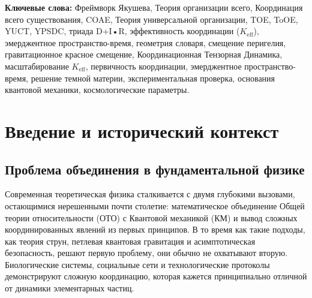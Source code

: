 \documentclass[11pt,a4paper]{article}
\begin{document}
\begin{abstract}
		Фреймворк является микропричинным ($v \leq c$ всегда), воспроизводит Общую теорию относительности и Квантовую механику в проверенных пределах, когда эффективность координации $K_{\mathrm{eff}} \to 1$, и дает проверяемые предсказания для прецизионных измерений в астрофизике, физике частиц и квантовой информации.
		
		\vspace{0.5em}
		\noindent \textbf{Ключевое открытие:} 
		Мы идентифицируем аксиоматический каркас теории как замкнутую \textbf{Алгебраическую петлю} фундаментальных констант ($S_{\mathrm{odd}} = 6/5$, $S_{\mathrm{even}} = 4/5$), которая строго определяет универсальный показатель масштабирования $\beta = 2/3$. Мы демонстрируем, что эта петля образует самосогласованную, безпараметрическую логическую систему. Внутренняя согласованность этой структуры мощно подтверждается возникающим геометрическим совпадением высокой точности: $S_{\mathrm{odd}}\varphi^2 \approx \pi$ (ошибка $10^{-5}$), связывающим дискретный спектр масс фермионов непосредственно с непрерывной геометрией пространства-времени. Это устанавливает YUCT не как феноменологическую подгонку, а как единую, фальсифицируемую аксиоматическую основу для координационной динамики реальности.
		
	\end{abstract}
	
	\noindent\textbf{Ключевые слова:} Фреймворк Якушева, Теория организации всего, Координация всего существования, COAE, Теория универсальной организации, TOE, ToOE, YUCT, YPSDC, триада D+I•R, эффективность координации ($K_{\mathrm{eff}}$), эмерджентное пространство-время, геометрия словаря, смещение перигелия, гравитационное красное смещение, Координационная Тензорная Динамика, масштабирование $K_{\mathrm{eff}}$, первичность координации, эмерджентное пространство-время, решение темной материи, экспериментальная проверка, основания квантовой механики, космологические параметры.
	\newpage
	\tableofcontents
	
	\newpage
	
	\section{Введение и исторический контекст}
	\subsection{Проблема объединения в фундаментальной физике}
	Современная теоретическая физика сталкивается с двумя глубокими вызовами, остающимися нерешенными почти столетие: математическое объединение Общей теории относительности (ОТО) с Квантовой механикой (КМ) и вывод сложных координированных явлений из первых принципов. В то время как такие подходы, как теория струн, петлевая квантовая гравитация и асимптотическая безопасность, решают первую проблему, они обычно не охватывают вторую. Биологические системы, социальные сети и технологические протоколы демонстрируют сложную координацию, которая кажется принципиально отличной от динамики элементарных частиц.
	
\end{document}
